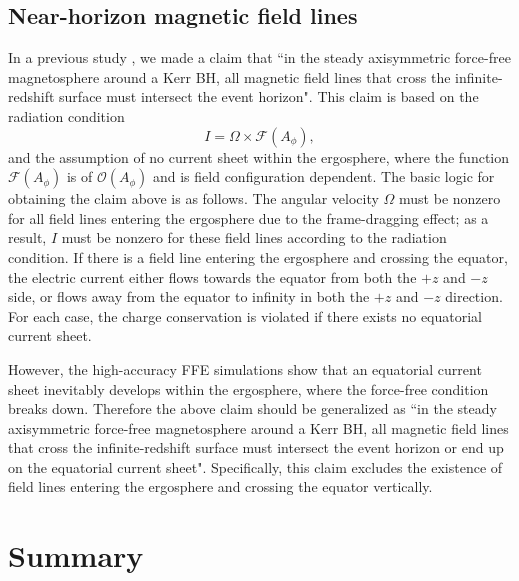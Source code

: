 \documentclass[aps,prd,reprint,nofootinbib, superscriptaddress]{revtex4-1}
\def\Ap{A_\phi}
\def\be{\begin{equation}}
\def\ee{\end{equation}}
\begin{document}
\subsection{Near-horizon magnetic field lines}
In a previous study \cite{Pan2016a}, we made a claim that ``in the steady axisymmetric force-free magnetosphere
around a Kerr BH, all magnetic field lines that cross the infinite-redshift surface must intersect the event horizon".
This claim is based on the radiation condition
\be
\label{eq:Grad}
I = \Omega \times \mathcal F(\Ap),
\ee
and the assumption of no current sheet within the ergosphere,
where the function $\mathcal F(\Ap)$ is of $\mathcal O(\Ap)$ and  is field configuration dependent.
The basic logic for obtaining the claim above is as follows.
The angular velocity $\Omega$ must be nonzero for all field lines entering the ergosphere due to the frame-dragging effect;
as a result, $I$ must be nonzero for these field lines according to the radiation condition.
If there is a field line entering the ergosphere and crossing the equator, the electric current either flows
towards the equator from both the $+z$ and $-z$ side, or flows away from the equator to infinity in
both the $+z$ and $-z$ direction. For each case, the charge conservation is violated
if there exists no equatorial current sheet.

However, the high-accuracy FFE simulations show that an equatorial current sheet inevitably develops within the ergosphere, where
the force-free condition breaks down. Therefore the above claim should be generalized as
``in the steady axisymmetric force-free magnetosphere
around a Kerr BH, all magnetic field lines that cross the infinite-redshift surface
must intersect the event horizon or end up on the equatorial current sheet". Specifically,
this claim excludes the existence of field lines entering the ergosphere and crossing the
equator vertically.


\section{Summary}
\label{sec:summary}
\end{document}
